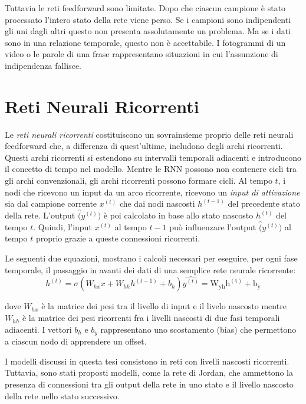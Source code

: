 Tuttavia le reti feedforward sono limitate.
Dopo che ciascun campione \`e stato processato l'intero stato della rete viene perso.
Se i campioni sono indipendenti gli uni dagli altri questo non presenta assolutamente un problema.
Ma se i dati sono in una relazione temporale, questo non \`e accettabile.
I fotogrammi di un video o le parole di una frase rappresentano situazioni in cui l'assunzione di indipendenza fallisce.

\section{Reti Neurali Ricorrenti}
Le \emph{reti neurali ricorrenti} costituiscono un sovrainsieme proprio delle reti neurali feedforward che, a differenza di quest'ultime, includono degli archi ricorrenti.
Questi archi ricorrenti si estendono su intervalli temporali adiacenti e introducono il concetto di tempo nel modello.
Mentre le RNN possono non contenere cicli tra gli archi convenzionali, gli archi ricorrenti possono formare cicli.
Al tempo $t$, i nodi che ricevono un input da un arco ricorrente, ricevono un \emph{input di attivazione} sia dal campione corrente $x^({t})$ che dai nodi nascosti $h^{(t-1)}$ del precedente stato della rete.
L'output $\hat(y^{(t)})$ \`e poi calcolato in base allo stato nascosto $h^{(t)}$ del tempo $t$.
Quindi, l'input $x^({t})$ al tempo $t-1$ pu\`o influenzare l'output $\hat(y^{(t)})$ al tempo $t$ proprio grazie a queste connessioni ricorrenti.

Le seguenti due equazioni, mostrano i calcoli necessari per eseguire, per ogni fase temporale, il passaggio in avanti dei dati di una semplice rete neurale ricorrente:
\begin{equation*}
  h^{(t)} = \sigma(W_{hx}x + W_{hh}h^{(t-1)} + b_h)
  \hat{y^{(t)}} = \operatorname{W_{yh}h^{(t)} + b_y}
\end{equation*}

dove $W_{hx}$ \`e la matrice dei pesi tra il livello di input e il livelo nascosto mentre $W_{hh}$ \`e la matrice dei pesi ricorrenti fra i livelli nascosti di due fasi temporali adiacenti.
I vettori $b_h$ e $b_y$ rappresentano uno scostamento (bias) che permettono a ciascun nodo di apprendere un offset.

I modelli discussi in questa tesi consistono in reti con livelli nascosti ricorrenti.
Tuttavia, sono stati proposti modelli, come la rete di Jordan, che ammettono la presenza di connessioni tra gli output della rete in uno stato e il livello nascosto della rete nello stato successivo.

